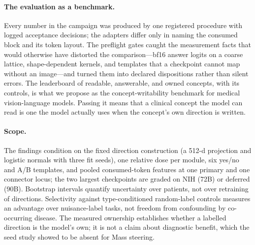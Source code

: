 \paragraph{The evaluation as a benchmark.}
Every number in the campaign was produced by one registered procedure with logged acceptance decisions; the adapters differ only in naming the consumed block and its token layout. The preflight gates caught the measurement facts that would otherwise have distorted the comparison---bf16 answer logits on a coarse lattice, shape-dependent kernels, and templates that a checkpoint cannot map without an image---and turned them into declared dispositions rather than silent errors. The leaderboard of readable, answerable, and owned concepts, with its controls, is what we propose as the concept-writability benchmark for medical vision-language models. Passing it means that a clinical concept the model can read is one the model actually uses when the concept's own direction is written.

\paragraph{Scope.}
The findings condition on the fixed direction construction (a 512-d projection and logistic normals with three fit seeds), one relative dose per module, six yes/no and A/B templates, and pooled consumed-token features at one primary and one connector locus; the two largest checkpoints are graded on NIH (72B) or deferred (90B). Bootstrap intervals quantify uncertainty over patients, not over retraining of directions. Selectivity against type-conditioned random-label controls measures an advantage over nuisance-label tasks, not freedom from confounding by co-occurring disease. The measured ownership establishes whether a labelled direction is the model's own; it is not a claim about diagnostic benefit, which the seed study showed to be absent for Mass steering.
